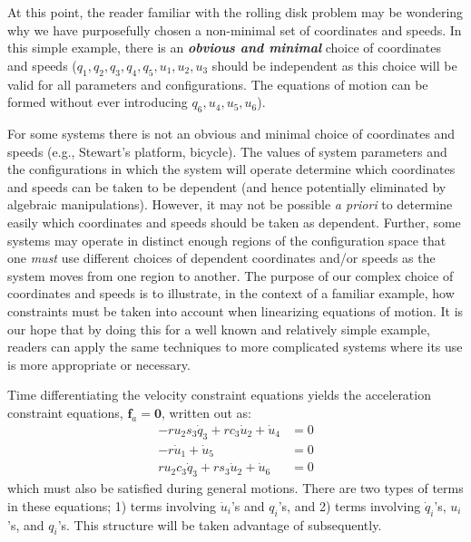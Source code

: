 \documentclass[smallcondensed,final]{svjour3}                     %
\begin{document}
At this point, the reader familiar with the rolling disk problem may be
wondering why we have purposefully chosen a non-minimal set of coordinates and
speeds.  In this simple example, there is an {\bf \textit{obvious and minimal}}
choice of coordinates and speeds ($q_1, q_2, q_3, q_4, q_5, u_1, u_2, u_3$
should be independent as this choice will be valid for all parameters and
configurations.  The equations of motion can be formed without ever introducing
$q_6, u_4, u_5, u_6$).

For some systems there is not an obvious and minimal choice of coordinates and
speeds (e.g., Stewart's platform, bicycle).  The values of system parameters
and the configurations in which the system will operate determine which
coordinates and speeds can be taken to be dependent (and hence potentially
eliminated by algebraic manipulations).  However, it may not be possible
\textit{a priori} to determine easily which coordinates and speeds should be
taken as dependent. Further, some systems may operate in distinct enough
regions of the configuration space that one \textit{must} use different choices
of dependent coordinates and/or speeds as the system moves from one region to
another. The purpose of our complex choice of coordinates and speeds is to
illustrate, in the context of a familiar example, how constraints must be taken
into account when linearizing equations of motion. It is our hope that by doing
this for a well known and relatively simple example, readers can apply the same
techniques to more complicated systems where its use is more appropriate or
necessary.

Time differentiating the velocity constraint equations yields the acceleration
constraint equations, $\mathbf{f}_a = \mathbf{0}$, written out as:
\begin{subequations}
\label{rd:f_a}
\begin{align}
    -r u_{2} s_3 \dot{q}_{3} + r c_3 \dot{u}_{2} + \dot{u}_{4} &=
    0\\
    - r \dot{u}_{1} + \dot{u}_{5} &= 0\\
    r u_{2} c_3 \dot{q}_{3} + r s_3 \dot{u}_{2} + \dot{u}_{6} &=
    0
\end{align}
\end{subequations}
which must also be satisfied during general motions. There are two types of
terms in these equations; 1) terms involving $\dot{u}_i$'s and $q_i$'s, and 2)
terms involving $\dot{q}_i$'s, $u_i$'s, and $q_i$'s. This structure will be
taken advantage of subsequently.
\end{document}
